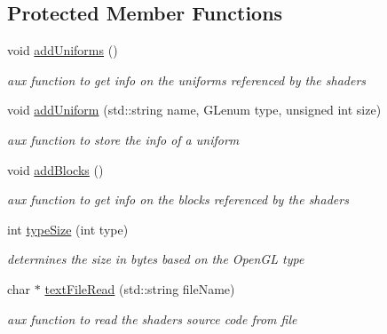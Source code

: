 \subsection*{Protected Member Functions}
\begin{DoxyCompactItemize}
\item 
void \hyperlink{class_v_s_shader_lib_abc505e5c5799a80a1752e645647fcb1e}{add\+Uniforms} ()
\begin{DoxyCompactList}\small\item\em aux function to get info on the uniforms referenced by the shaders \end{DoxyCompactList}\item 
void \hyperlink{class_v_s_shader_lib_a402dabee8554c65017c23661a9ab77a5}{add\+Uniform} (std\+::string name, G\+Lenum type, unsigned int size)
\begin{DoxyCompactList}\small\item\em aux function to store the info of a uniform \end{DoxyCompactList}\item 
void \hyperlink{class_v_s_shader_lib_aa3d473e3e859d33743afcaeba5b74603}{add\+Blocks} ()
\begin{DoxyCompactList}\small\item\em aux function to get info on the blocks referenced by the shaders \end{DoxyCompactList}\item 
int \hyperlink{class_v_s_shader_lib_a23d7f374028eeb02cd6df8019eaa7a6f}{type\+Size} (int type)
\begin{DoxyCompactList}\small\item\em determines the size in bytes based on the Open\+GL type \end{DoxyCompactList}\item 
char $\ast$ \hyperlink{class_v_s_shader_lib_a7e9e011a122f2c0956ba6c885864b00b}{text\+File\+Read} (std\+::string file\+Name)
\begin{DoxyCompactList}\small\item\em aux function to read the shader\textquotesingle{}s source code from file \end{DoxyCompactList}\end{DoxyCompactItemize}
